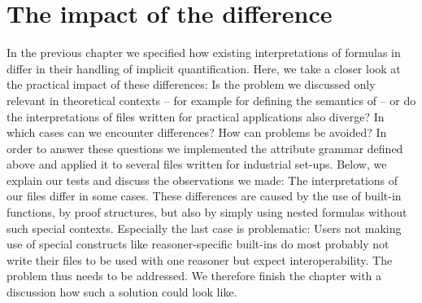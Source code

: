 
\chapter{The impact of the difference}\label{eva}
In the previous chapter we 
specified how existing interpretations of formulas in \nthreelogic differ in their handling of implicit quantification. Here, 
we take a closer look at the practical impact of these differences: 
Is the problem we discussed only relevant in theoretical contexts -- for example for defining the semantics of \nthreelogic{} -- or do the interpretations 
of files written for practical applications also diverge?
In which cases can we encounter differences? How can problems be avoided?
% 
In order to answer these questions we implemented the attribute grammar defined above and applied it to several \nthree files written for industrial set-ups.
Below, we explain our tests and discuss the observations we made: The interpretations of our files differ in some cases. These differences are
caused by the use of built-in functions, by proof 
structures, but also by simply using nested formulas without such special contexts. Especially the last case is problematic: Users not making use of special constructs like 
reasoner-specific built-ins do most probably not write their files to be used with one reasoner but expect interoperability.
The problem thus needs to be addressed.
We therefore finish the chapter with a discussion how such a solution could look like.

% 
%

